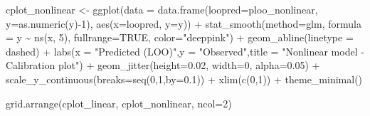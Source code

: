 \documentclass[
  letterpaper,
  DIV=11,
  numbers=noendperiod]{scrartcl}
\newenvironment{Shaded}{\begin{snugshade}}{\end{snugshade}}
\newcommand{\AttributeTok}[1]{\textcolor[rgb]{0.40,0.45,0.13}{#1}}
\newcommand{\ConstantTok}[1]{\textcolor[rgb]{0.56,0.35,0.01}{#1}}
\newcommand{\DecValTok}[1]{\textcolor[rgb]{0.68,0.00,0.00}{#1}}
\newcommand{\FloatTok}[1]{\textcolor[rgb]{0.68,0.00,0.00}{#1}}
\newcommand{\FunctionTok}[1]{\textcolor[rgb]{0.28,0.35,0.67}{#1}}
\newcommand{\NormalTok}[1]{\textcolor[rgb]{0.00,0.23,0.31}{#1}}
\newcommand{\OtherTok}[1]{\textcolor[rgb]{0.00,0.23,0.31}{#1}}
\newcommand{\SpecialCharTok}[1]{\textcolor[rgb]{0.37,0.37,0.37}{#1}}
\newcommand{\StringTok}[1]{\textcolor[rgb]{0.13,0.47,0.30}{#1}}
\begin{document}
\begin{Shaded}
\begin{Highlighting}[]
\NormalTok{cplot\_nonlinear }\OtherTok{\textless{}{-}} \FunctionTok{ggplot}\NormalTok{(}\AttributeTok{data =} \FunctionTok{data.frame}\NormalTok{(}\AttributeTok{loopred=}\NormalTok{ploo\_nonlinear,}
  \AttributeTok{y=}\FunctionTok{as.numeric}\NormalTok{(y)}\SpecialCharTok{{-}}\DecValTok{1}\NormalTok{), }\FunctionTok{aes}\NormalTok{(}\AttributeTok{x=}\NormalTok{loopred, }\AttributeTok{y=}\NormalTok{y)) }\SpecialCharTok{+} 
  \FunctionTok{stat\_smooth}\NormalTok{(}\AttributeTok{method=}\StringTok{\textquotesingle{}glm\textquotesingle{}}\NormalTok{, }\AttributeTok{formula =}\NormalTok{ y }\SpecialCharTok{\textasciitilde{}} \FunctionTok{ns}\NormalTok{(x, }\DecValTok{5}\NormalTok{), }\AttributeTok{fullrange=}\ConstantTok{TRUE}\NormalTok{, }\AttributeTok{color=}\StringTok{"deeppink"}\NormalTok{) }\SpecialCharTok{+}
  \FunctionTok{geom\_abline}\NormalTok{(}\AttributeTok{linetype =} \StringTok{\textquotesingle{}dashed\textquotesingle{}}\NormalTok{) }\SpecialCharTok{+} 
  \FunctionTok{labs}\NormalTok{(}\AttributeTok{x =} \StringTok{"Predicted (LOO)"}\NormalTok{,}\AttributeTok{y =} \StringTok{"Observed"}\NormalTok{,}\AttributeTok{title =} \StringTok{"Nonlinear model {-} Calibration plot"}\NormalTok{) }\SpecialCharTok{+}
  \FunctionTok{geom\_jitter}\NormalTok{(}\AttributeTok{height=}\FloatTok{0.02}\NormalTok{, }\AttributeTok{width=}\DecValTok{0}\NormalTok{, }\AttributeTok{alpha=}\FloatTok{0.05}\NormalTok{) }\SpecialCharTok{+} 
  \FunctionTok{scale\_y\_continuous}\NormalTok{(}\AttributeTok{breaks=}\FunctionTok{seq}\NormalTok{(}\DecValTok{0}\NormalTok{,}\DecValTok{1}\NormalTok{,}\AttributeTok{by=}\FloatTok{0.1}\NormalTok{)) }\SpecialCharTok{+} 
  \FunctionTok{xlim}\NormalTok{(}\FunctionTok{c}\NormalTok{(}\DecValTok{0}\NormalTok{,}\DecValTok{1}\NormalTok{)) }\SpecialCharTok{+}
  \FunctionTok{theme\_minimal}\NormalTok{() }

\FunctionTok{grid.arrange}\NormalTok{(cplot\_linear, cplot\_nonlinear, }\AttributeTok{ncol=}\DecValTok{2}\NormalTok{)}
\end{Highlighting}
\end{Shaded}
\end{document}
